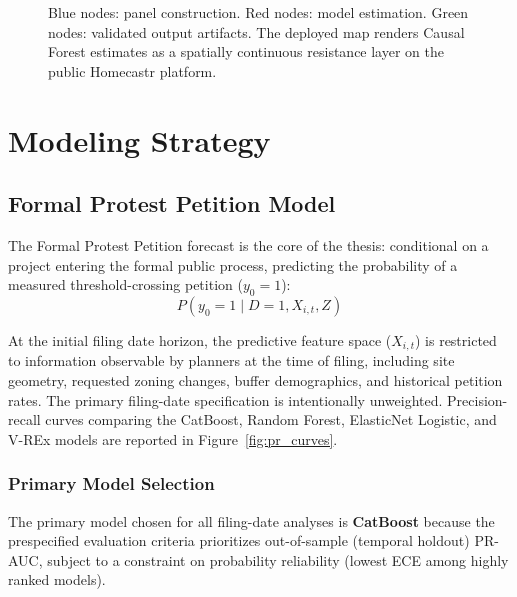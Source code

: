 \documentclass[twoside,11pt]{article}
\begin{document}
\begin{figure}[!htbp]
{
}
\caption[Data-to-Deployment Causal Pipeline]{Blue nodes: panel construction. Red nodes: model estimation. Green nodes: validated output artifacts. The deployed map renders Causal Forest estimates as a spatially continuous resistance layer on the public Homecastr platform.}
\label{fig:pipeline_arch}
\end{figure}

\section{Modeling Strategy}


\subsection{Formal Protest Petition Model}

The Formal Protest Petition forecast is the core of the thesis: conditional on a project entering the formal public process, predicting the probability of a measured threshold-crossing petition ($y_0 = 1$):
\begin{equation}
P(y_0 = 1 \mid D=1, X_{i,t}, Z)
\end{equation}

At the initial filing date horizon, the predictive feature space ($X_{i,t}$) is restricted to information observable by planners at the time of filing, including site geometry, requested zoning changes, buffer demographics, and historical petition rates. The primary filing-date specification is intentionally unweighted. Precision-recall curves comparing the CatBoost, Random Forest, ElasticNet Logistic, and V-REx models are reported in Figure~\ref{fig:pr_curves}.



\subsubsection{Primary Model Selection}
The primary model chosen for all filing-date analyses is \textbf{CatBoost} because the prespecified evaluation criteria prioritizes out-of-sample (temporal holdout) PR-AUC, subject to a constraint on probability reliability (lowest ECE among highly ranked models).
\end{document}
